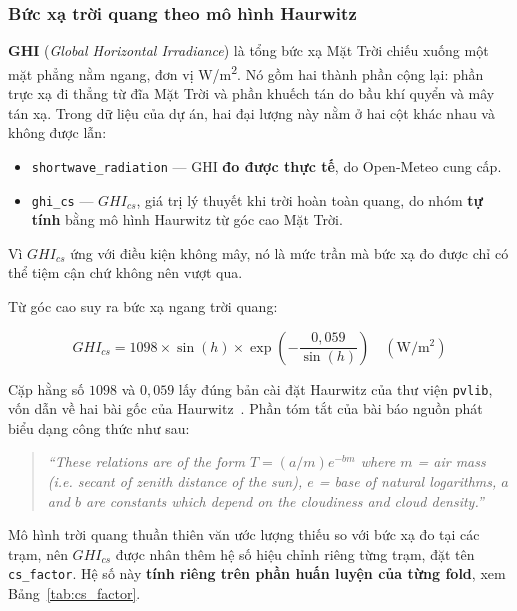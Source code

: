 \documentclass[12pt, a4paper]{report}
\begin{document}
\subsubsection{Bức xạ trời quang theo mô hình Haurwitz}

\textbf{GHI} (\textit{Global Horizontal Irradiance}) là tổng bức xạ Mặt Trời chiếu
xuống một mặt phẳng nằm ngang, đơn vị W/m\textsuperscript{2}. Nó gồm hai thành phần cộng
lại: phần trực xạ đi thẳng từ đĩa Mặt Trời và phần khuếch tán do bầu khí quyển và mây tán
xạ. Trong dữ liệu của dự án, hai đại lượng này nằm ở hai cột khác nhau và không được
lẫn:

\begin{itemize}
    \item \texttt{shortwave\_radiation} --- GHI \textbf{đo được thực tế}, do Open-Meteo cung cấp.
    \item \texttt{ghi\_cs} --- $GHI_{cs}$, giá trị lý thuyết khi trời hoàn toàn quang, do nhóm
    \textbf{tự tính} bằng mô hình Haurwitz từ góc cao Mặt Trời.
\end{itemize}

Vì $GHI_{cs}$ ứng với điều kiện không mây, nó là mức trần mà bức xạ đo được chỉ có thể tiệm
cận chứ không nên vượt qua.

Từ góc cao suy ra bức xạ ngang trời quang:

\begin{equation}
GHI_{cs} = 1098 \times \sin(h) \times \exp\!\left(-\frac{0{,}059}{\sin(h)}\right)
\quad (\mathrm{W/m^2})
\end{equation}

Cặp hằng số $1098$ và $0{,}059$ lấy đúng bản cài đặt Haurwitz của thư viện \texttt{pvlib},
vốn dẫn về hai bài gốc của Haurwitz~\cite{haurwitz1945}. Phần tóm tắt của bài báo
nguồn phát biểu dạng công thức như sau:

\begin{quote}\small
\textit{``These relations are of the form $T = (a/m)e^{-bm}$ where $m$ = air mass (i.e. secant of zenith distance of the sun), $e$ = base of natural logarithms, $a$ and $b$ are constants which depend on the cloudiness and cloud density.''}
\end{quote}


Mô hình trời quang thuần thiên văn ước lượng thiếu so với bức xạ đo tại các trạm, nên
$GHI_{cs}$ được nhân thêm hệ số hiệu chỉnh riêng từng trạm, đặt tên \texttt{cs\_factor}. Hệ số
này \textbf{tính riêng trên phần huấn luyện của từng fold}, xem Bảng~\ref{tab:cs_factor}.
\end{document}
